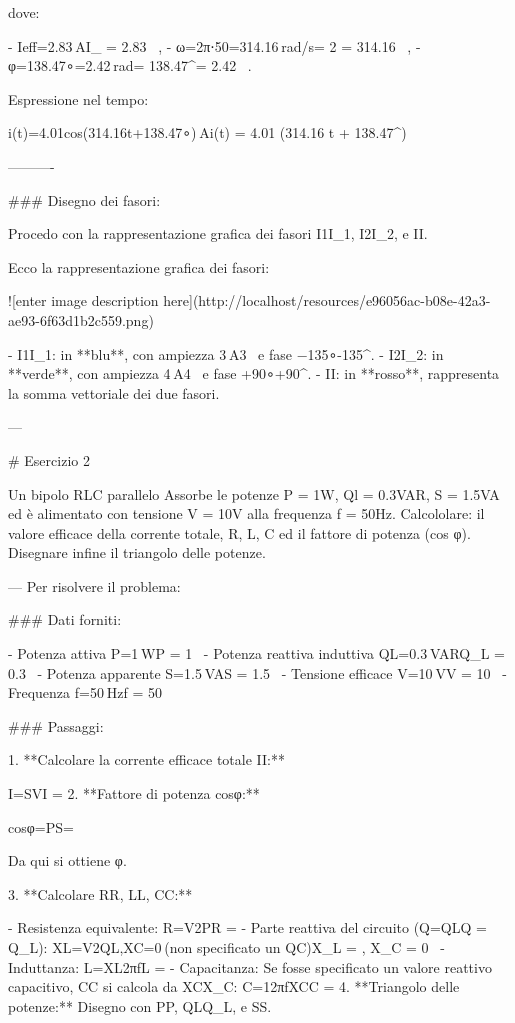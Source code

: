 dove:

-   Ieff=2.83 AI_{} = 2.83 \, ,
-   ω=2π⋅50=314.16 rad/s\omega = 2 \pi {} = 314.16 \, ,
-   φ=138.47∘=2.42 rad\varphi = 138.47^\circ = 2.42 \, .

Espressione nel tempo:

i(t)=4.01cos⁡(314.16t+138.47∘) Ai(t) = 4.01 \cos(314.16 t + 138.47^\circ) \, 

----------

### Disegno dei fasori:

Procedo con la rappresentazione grafica dei fasori I1I_1, I2I_2, e II.

Ecco la rappresentazione grafica dei fasori:

![enter image description here](http://localhost/resources/e96056ac-b08e-42a3-ae93-6f63d1b2c559.png)

-   I1I_1: in **blu**, con ampiezza 3 A3 \,  e fase −135∘-135^\circ.
-   I2I_2: in **verde**, con ampiezza 4 A4 \,  e fase +90∘+90^\circ.
-   II: in **rosso**, rappresenta la somma vettoriale dei due fasori.


---

# Esercizio 2

Un bipolo RLC parallelo Assorbe le potenze P = 1W, Ql = 0.3VAR, S = 1.5VA ed è alimentato con tensione V = 10V alla frequenza f = 50Hz.
Calcololare: il valore efficace della corrente totale, R, L, C ed il fattore di potenza (cos φ). Disegnare infine il triangolo delle potenze.

---
Per risolvere il problema:

### Dati forniti:

-   Potenza attiva P=1 WP = 1 \, 
-   Potenza reattiva induttiva QL=0.3 VARQ_L = 0.3 \, 
-   Potenza apparente S=1.5 VAS = 1.5 \, 
-   Tensione efficace V=10 VV = 10 \, 
-   Frequenza f=50 Hzf = 50 \, 

### Passaggi:

1.  **Calcolare la corrente efficace totale II:**

    I=SVI = 
2.  **Fattore di potenza cos⁡φ\cos\varphi:**

    cos⁡φ=PS\cos\varphi = 

    Da qui si ottiene φ\varphi.

3.  **Calcolare RR, LL, CC:**

    -   Resistenza equivalente: R=V2PR = 
    -   Parte reattiva del circuito (Q=QLQ = Q_L): XL=V2QL,XC=0 (non specificato un QC)X_L = , \quad X_C = 0 \, 
    -   Induttanza: L=XL2πfL = 
    -   Capacitanza: Se fosse specificato un valore reattivo capacitivo, CC si calcola da XCX_C: C=12πfXCC = 
4.  **Triangolo delle potenze:** Disegno con PP, QLQ_L, e SS.


